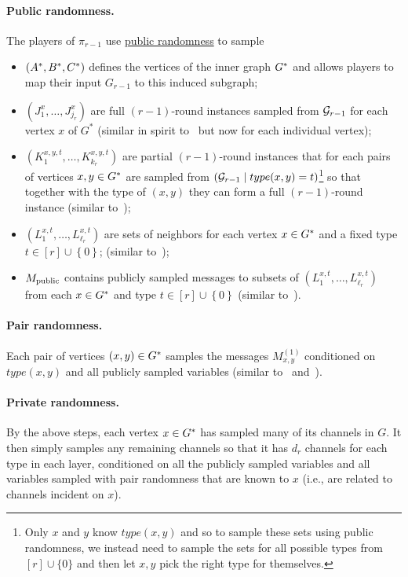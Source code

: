 \documentclass[11pt]{article}
\theoremstyle{definition}
\newcommand{\set}[1]{\ensuremath{\left\{ #1 \right\}}}
\newcommand{\prot}{\ensuremath{\pi}}
\begin{document}
\paragraph{Public randomness.} The players of $\prot_{r-1}$ use \underline{public randomness} to sample 
\begin{itemize}
	\item $(A^*,B^*,C^*)$ defines the vertices of the inner graph $G^*$ and allows players to map their input $G_{r-1}$ to this induced subgraph; 
	\item $(J^x_1,\ldots,J^x_{j_r})$ are {full} $(r-1)$-round instances sampled from $\mathcal{G}_{r-1}$ for each vertex $x$ of $G^*$ (similar in spirit to~ but now for each individual vertex);
	\item $(K^{x,y,t}_1,\ldots,K^{x,y,t}_{k_r})$ are {partial} $(r-1)$-round instances that for each pairs of vertices $x,y \in G^*$ are sampled from $(\mathcal{G}_{r-1} \mid type(x,y)=t)$\footnote{\label{footnote} Only $x$ and $y$ know $type(x,y)$ and so to sample these
		sets using public randomness, we instead need to sample the sets for all possible types from $[r] \cup \{0\}$ and then let $x,y$ pick the right type for themselves.}  so that together with the type of $(x,y)$ they can form a full $(r-1)$-round instance (similar to~); 
	\item $(L^{x,t}_1,\ldots,L^{x,t}_{\ell_r})$ are sets of neighbors for each vertex $x \in G^*$ and a fixed type $t \in [r] \cup \set{0}$;  (similar to~); 
	\item $M_{\textnormal{public}}$ contains publicly sampled messages to subsets of $(L^{x,t}_1,\ldots,L^{x,t}_{\ell_r})$ from each $x \in G^*$ and type $t \in [r] \cup \set{0}$  (similar to~). 
\end{itemize}
\paragraph{Pair randomness.} Each pair of vertices $(x,y) \in G^*$ samples the messages $M^{(1)}_{x,y}$ conditioned on $type(x,y)$ and all publicly sampled variables (similar to~ and~). 

\paragraph{Private randomness.} By the above steps, each vertex $x \in G^*$ has sampled many of its channels in $G$. It then simply samples any remaining channels so that it has $d_r$ channels for each type in each layer, conditioned
on all the publicly sampled variables and all variables sampled with pair randomness that are known to $x$ (i.e., are related to channels incident on $x$). 
\end{document}

